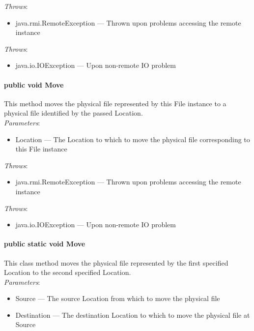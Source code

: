 \documentclass[$Date: 2003/06/26 19:29:31 $]{glabarticle}
\begin{document}
 \textit{Throws}:
 \begin{itemize}
 \item[] java.rmi.RemoteException --- Thrown upon problems accessing the remote instance 
 \end{itemize}
 
\textit{Throws}:
\begin{itemize}
\item[] java.io.IOException --- Upon non-remote IO problem 
\end{itemize}

\paragraph{public void Move}

This method moves the physical file represented by this File instance
to a physical file identified by the passed Location. \\

 \textit{Parameters}:
 \begin{itemize}
 \item[] Location --- The Location to which to move the physical file corresponding to this File instance
 \end{itemize}
 
 \textit{Throws}:
 \begin{itemize}
 \item[] java.rmi.RemoteException --- Thrown upon problems accessing the remote instance 
 \end{itemize}
 
\textit{Throws}:
\begin{itemize}
\item[] java.io.IOException --- Upon non-remote IO problem 
\end{itemize}
 
\paragraph{public static void Move}

This class method moves the physical file represented by the first specified Location to the second specified 
Location. \\

 \textit{Parameters}:
 \begin{itemize}
 \item[] Source --- The source Location from which to move the physical file
 \item[] Destination --- The destination Location to which to move the physical file at Source
 \end{itemize}
 
\end{document}
